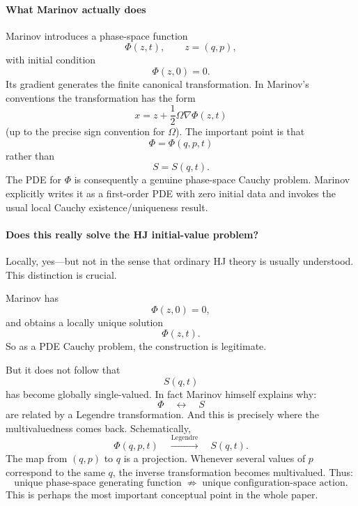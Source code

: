 \paragraph{ What Marinov actually does}
Marinov introduces a phase-space function
$$ \Phi(z,t),\qquad z=(q,p), $$
with initial condition
$$ \Phi(z,0)=0. $$
Its gradient generates the finite canonical transformation. In Marinov's conventions the transformation has the form
$$ x = z+\frac12\Omega\nabla\Phi(z,t) $$
(up to the precise sign convention for \(\Omega\)).
The important point is that
$$ \boxed{\Phi=\Phi(q,p,t)} $$
rather than
$$ \boxed{S=S(q,t)}. $$
The PDE for \(\Phi\) is consequently a genuine phase-space Cauchy problem.
Marinov explicitly writes it as a first-order PDE with zero initial data and
invokes the usual local Cauchy existence/uniqueness result.

\paragraph{Does this really solve the HJ initial-value problem?}
Locally, yes—but not in the sense that ordinary HJ theory is usually understood.
This distinction is crucial.

Marinov has
$$ \Phi(z,0)=0, $$
and obtains a locally unique solution
$$ \Phi(z,t). $$
So as a PDE Cauchy problem, the construction is legitimate.

But it does not follow that
$$ S(q,t) $$
has become globally single-valued.
In fact Marinov himself explains why:
$$ \Phi \quad\longleftrightarrow\quad S $$
are related by a Legendre transformation.
And this is precisely where the multivaluedness comes back.
Schematically,
$$ \Phi(q,p,t) \quad\stackrel{\text{Legendre}}\longrightarrow\quad S(q,t). $$
The map from \((q,p)\) to \(q\) is a projection.
Whenever several values of \(p\) correspond to the same \(q\), the inverse
transformation becomes multivalued.
Thus:
$$ \boxed{ \text{unique phase-space generating function} \;\not\Rightarrow\; \text{unique configuration-space action}. } $$
This is perhaps the most important conceptual point in the whole paper.

